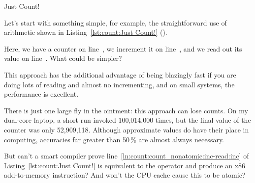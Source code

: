 \begin{listing}[tbp]

\caption{Just Count!}
\label{lst:count:Just Count!}
\end{listing}

Let's start with something simple, for example, the straightforward
use of arithmetic shown in
Listing~\ref{lst:count:Just Count!} ().
\begin{lineref}
Here, we have a counter on line~, we increment it on
line~, and we read out its value on line~.
What could be simpler?
\end{lineref}

This approach has the additional advantage of being blazingly fast if
you are doing lots of reading and almost no incrementing, and on small
systems, the performance is excellent.

There is just one large fly in the ointment: this approach can lose
counts.
On my dual-core laptop, a short run invoked 
100,014,000 times, but the final value of the counter was only
52,909,118.
Although approximate values do have their place in computing,
accuracies far greater than 50\,\% are almost always necessary.

\QuickQuiz{}
	But can't a smart compiler prove
	line~\ref{ln:count:count_nonatomic:inc-read:inc}
	of 
	Listing~\ref{lst:count:Just Count!}
	is equivalent to the \co{++} operator and produce an x86
	add-to-memory instruction?
	And won't the CPU cache cause this to be atomic?
 \QuickQuizEnd

